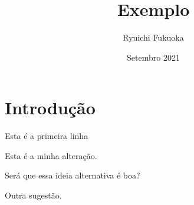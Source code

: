 \documentclass{article}
\title{Exemplo}
\author{Ryuichi Fukuoka}
\date{Setembro 2021}
\begin{document}
\maketitle

\section{Introdução}

\indent

Esta é a primeira linha

Esta é a minha alteração.

Será que essa ideia alternativa é boa?

Outra sugestão.
\end{document}
